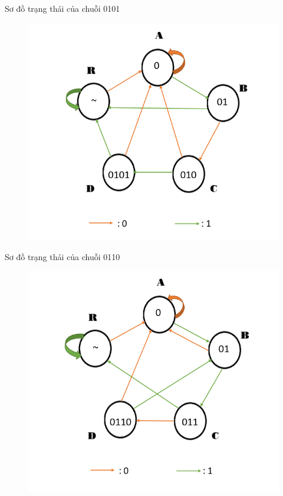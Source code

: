 \documentclass[a4paper]{article}
\begin{document}
		Sơ đồ trạng thái của chuỗi 0101
	\begin{center}
	\begin{figure}[h]
		\begin{center}
			\includegraphics[scale=0.53]{0101.png}
		\end{center}
	\end{figure}
	\end{center}
	\newpage
	Sơ đồ trạng thái của chuỗi 0110
	\begin{center}
	\begin{figure}[h]
		\begin{center}
			\includegraphics[scale=0.53]{0110.png}
		\end{center}
	\end{figure}
	\end{center}
	
\end{document}
